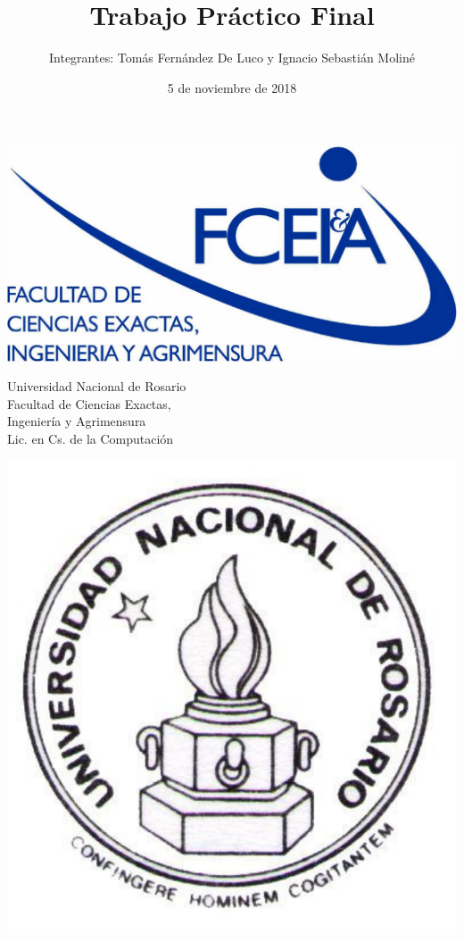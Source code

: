 \documentclass{article}
\title{Trabajo Práctico Final}
\author{Integrantes: Tomás Fernández De Luco y Ignacio Sebastián Moliné}
\date{5 de noviembre de 2018}
\begin{document}
\begin{titlepage}

\begin{minipage}{2.6cm}
\includegraphics[width=\textwidth]{fceia.pdf}
\end{minipage}
\hfill
%
\begin{minipage}{6cm}
\begin{center}
\normalsize{Universidad Nacional de Rosario\\
Facultad de Ciencias Exactas,\\
Ingeniería y Agrimensura\\}
\vspace{0.5cm}
\large
Lic. en Cs. de la Computación
\end{center}
\end{minipage}
\hspace{0.5cm}
\hfill
\begin{minipage}{2.6cm}
\includegraphics[width=\textwidth]{unr.pdf}
\end{minipage}


\end{titlepage}
\end{document}
